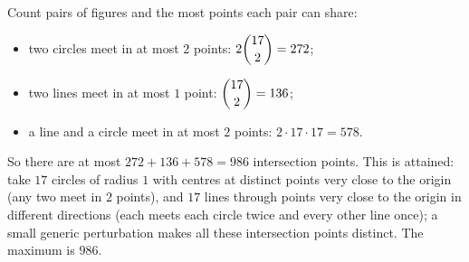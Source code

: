 Count pairs of figures and the most points each pair can share:
\begin{itemize}
\item two circles meet in at most $2$ points: $2\dbinom{17}{2}=272$;
\item two lines meet in at most $1$ point: $\dbinom{17}{2}=136$;
\item a line and a circle meet in at most $2$ points: $2\cdot17\cdot17=578$.
\end{itemize}
So there are at most $272+136+578=986$ intersection points. This is attained: take $17$ circles of radius $1$ with centres at distinct points very close to the origin (any two meet in $2$ points), and $17$ lines through points very close to the origin in different directions (each meets each circle twice and every other line once); a small generic perturbation makes all these intersection points distinct. The maximum is $\boxed{986}$.
